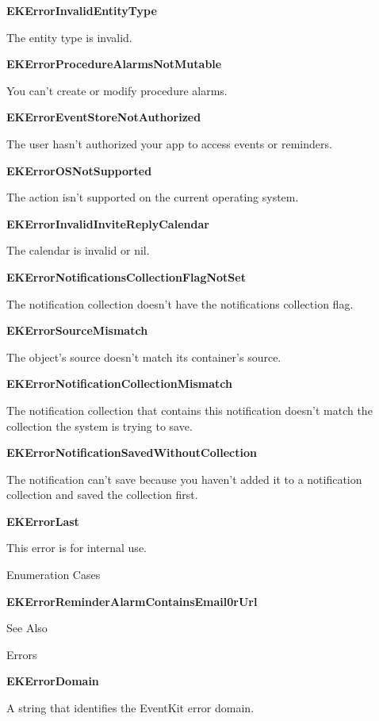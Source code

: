 \documentclass{article}
\begin{document}
\textbf{EKErrorInvalidEntityType}

The entity type is invalid.

\textbf{EKErrorProcedureAlarmsNotMutable}

You can't create or modify procedure alarms.

\textbf{EKErrorEventStoreNotAuthorized}

The user hasn't authorized your app to access events or reminders.

\textbf{EKErrorOSNotSupported}

The action isn't supported on the current operating system.

\textbf{EKErrorInvalidInviteReplyCalendar}

The calendar is invalid or nil.

\textbf{EKErrorNotificationsCollectionFlagNotSet}

The notification collection doesn't have the notifications collection flag.

\textbf{EKErrorSourceMismatch}

The object's source doesn't match its container's source.

\textbf{EKErrorNotificationCollectionMismatch}

The notification collection that contains this notification doesn't match the collection the system is trying to save.

\textbf{EKErrorNotificationSavedWithoutCollection}

The notification can't save because you haven't added it to a notification collection and saved the collection first.

\textbf{EKErrorLast}

This error is for internal use.

Enumeration Cases

\textbf{EKErrorReminderAlarmContainsEmail0rUrl}

See Also

Errors

\textbf{EKErrorDomain}

A string that identifies the EventKit error domain.

\newpage
\end{document}
